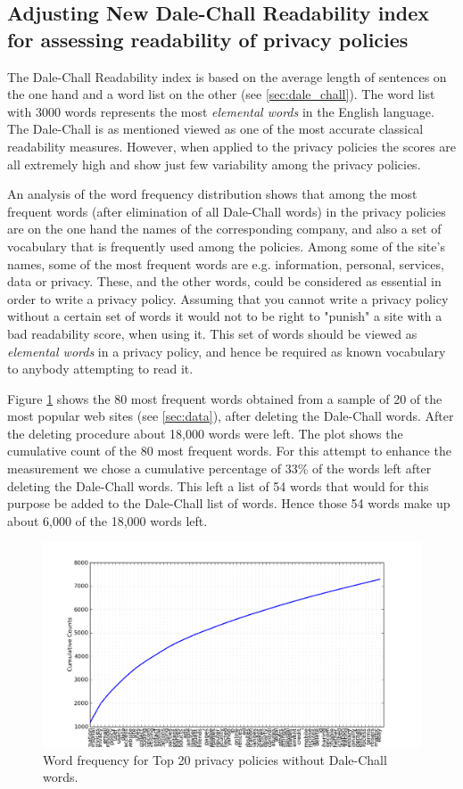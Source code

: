 \documentclass[runningheads,a4paper]{llncs}
\begin{document}
\subsection{Adjusting New Dale-Chall Readability index for assessing readability of privacy policies} \label{sec:NDC_enhanced}
The Dale-Chall Readability index is based on the average length of sentences on the one hand and a word list on the other (see \ref{sec:dale_chall}). The word list with 3000 words represents the most \emph{elemental words} in the English language. The Dale-Chall is as mentioned viewed as one of the most accurate classical readability measures. However, when applied to the privacy policies the scores are all extremely high and show just few variability among the privacy policies.

An analysis of the word frequency distribution shows that among the most frequent words (after elimination of all Dale-Chall words) in the privacy policies are on the one hand the names of the corresponding company, and also a set of vocabulary that is frequently used among the policies. Among some of the site's names, some of the most frequent words are e.g. information, personal, services, data or privacy.  These, and the other words, could be considered as essential in order to write a privacy policy. Assuming that you cannot write a privacy policy without a certain set of words it would not to be right to "punish" a site with a bad readability score, when using it. This set of words should be viewed as \emph{elemental words} in a privacy policy, and hence be required as known vocabulary to anybody attempting to read it.

Figure \ref{fig:word_frequency} shows the 80 most frequent words obtained from a sample of 20 of the most popular web sites (see \ref{sec:data}), after deleting the Dale-Chall words. After the deleting procedure about 18,000 words were left. The plot shows the cumulative count of the 80 most frequent words. For this attempt to enhance the measurement we chose a cumulative percentage of 33\% of the words left after deleting the Dale-Chall words. This left a list of 54 words that would for this purpose be added to the Dale-Chall list of words. Hence those 54 words make up about 6,000 of the 18,000 words left. 

\begin{figure}
\centering
\includegraphics[width=\textwidth]{Bilder/word_frequency_50.png}
\caption{Word frequency for Top 20 privacy policies without Dale-Chall words.}
\label{fig:word_frequency}
\end{figure}
\end{document}
